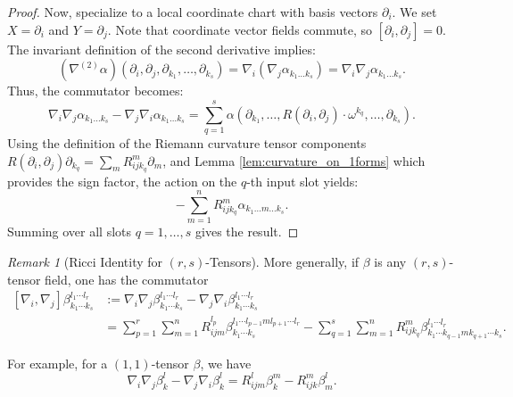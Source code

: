 \documentclass[11pt]{article}
\theoremstyle{plain}
\theoremstyle{definition}
\theoremstyle{remark}
\newtheorem{remark}[theorem]{Remark}
\begin{document}
\begin{proof}
    Now, specialize to a local coordinate chart with basis vectors $\partial_i$. We set $X = \partial_i$ and $Y = \partial_j$. Note that coordinate vector fields commute, so $[\partial_i, \partial_j] = 0$. The invariant definition of the second derivative implies:
    \begin{equation}
        (\nabla^{(2)} \alpha)(\partial_i, \partial_j, \partial_{k_1}, \dots, \partial_{k_s}) = \nabla_i (\nabla_j \alpha_{k_1 \dots k_s}) = \nabla_i \nabla_j \alpha_{k_1 \dots k_s}.
    \end{equation}
    Thus, the commutator becomes:
    \begin{equation}
        \nabla_i \nabla_j \alpha_{k_1 \dots k_s} - \nabla_j \nabla_i \alpha_{k_1 \dots k_s} = \sum_{q=1}^s \alpha(\partial_{k_1}, \dots, R(\partial_i, \partial_j)\cdot \omega^{k_q}, \dots, \partial_{k_s}).
    \end{equation}
    Using the definition of the Riemann curvature tensor components $R(\partial_i, \partial_j) \partial_{k_q} = \sum_m R_{ijk_q}^m \partial_m$, and Lemma \ref{lem:curvature_on_1forms} which provides the sign factor, the action on the $q$-th input slot yields:
    \begin{equation}
        - \sum_{m=1}^n R_{ijk_q}^m \alpha_{k_1 \dots m \dots k_s}.
    \end{equation}
    Summing over all slots $q=1, \dots, s$ gives the result.
\end{proof}

\begin{remark}[Ricci Identity for $(r,s)$-Tensors]
    More generally, if $\beta $ is any $\left(  r,s\right)  $-tensor field, one has the
commutator
\begin{align}
\left[  \nabla_{i},\nabla_{j}\right]  \beta_{k_{1}\cdots k_{s}}^{l_{1}%
\cdots l_{r}}  &  := \nabla_{i}\nabla_{j}\beta_{k_{1}\cdots k_{s}}^{l
_{1}\cdots l_{r}}-\nabla_{j}\nabla_{i}\beta_{k_{1}\cdots k_{s}}^{l_{1}\cdots l_{r}} \nonumber \\
&  =\sum_{p=1}^{r} \sum_{m=1}^n R_{ijm}^{l_{p}}\beta_{k_{1}\cdots k_{s}}^{l_{1}\cdots
l_{p-1}ml_{p+1}\cdots l_{r}}-\sum_{q=1}^{s} \sum_{m=1}^n R_{ijk_{q}}^{m}%
\beta_{k_{1}\cdots k_{q-1}mk_{q+1}\cdots k_{s}}^{l_{1}\cdots l_{r}}. \label{eq: commutatorRStensor}
\end{align}
\end{remark}


For example, for a $(1,1)$-tensor $\beta$, we have
\begin{equation}\label{eq:CD commutator 11 tensor}
    \nabla_i\nabla_j \beta_k^l - \nabla_j \nabla_i \beta_k^l =
    R_{ijm}^l\beta_k^m - R_{ijk}^m \beta_m^l.
\end{equation}
\end{document}
